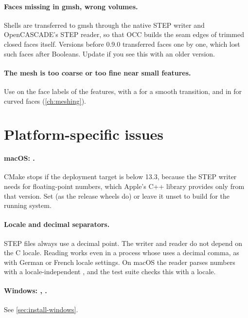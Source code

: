 \paragraph{Faces missing in gmsh, wrong volumes.} Shells are transferred to gmsh through the
native STEP writer and OpenCASCADE's STEP reader, so that OCC builds the seam edges of trimmed
closed faces itself. Versions before 0.9.0 transferred faces one by one, which lost such faces
after Booleans. Update if you see this with an older version.

\paragraph{The mesh is too coarse or too fine near small features.} Use
 on the face labels of the features, with a  for a
smooth transition, and  in  for curved faces (\cref{ch:meshing}).

\section{Platform-specific issues}\label{sec:ts-platform}

\paragraph{macOS: .} CMake stops if the deployment target is
below 13.3, because the STEP writer needs  for floating-point numbers, which
Apple's C++ library provides only from that version. Set
 (as the release wheels do) or leave it unset to build for the
running system.

\paragraph{Locale and decimal separators.} STEP files always use a decimal point. The writer
and reader do not depend on the C locale. Reading works even in a process whose
 uses a decimal comma, as with German or French locale settings. On macOS the
reader parses numbers with a locale-independent , and the test suite checks this
with a  locale.

\paragraph{Windows: , .} See
\cref{sec:install-windows}.

